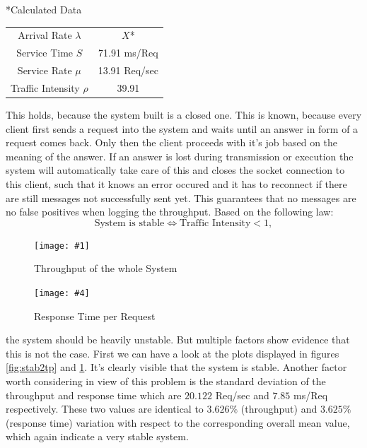 \documentclass[11pt]{article}
\newcommand\TwoFig[6]{%
	\sbox\IBoxA{\texttt{[image: \#1]}}
	\sbox\IBoxB{\texttt{[image: \#4]}}%
	\ifdim\ht\IBoxA>\ht\IBoxB
	\setlength\IHeight{\ht\IBoxB}\else\setlength\IHeight{\ht\IBoxA}\fi%
	\begin{figure}[!htb]
		\minipage[t]{0.5\textwidth}\centering
		\texttt{[image: \#1]}
		\caption{#2}\label{#3}
		\endminipage \hfill
		\minipage[t]{0.5\textwidth}\centering
		\texttt{[image: \#4]}
		\caption{#5}\label{#6}
		\endminipage
	\end{figure}%
}
\begin{document}
\begin{center}
	*{Calculated Data}
	\begin{tabular}{c|c}
		\hline
		Arrival Rate $\lambda$ & $X$* \\
		Service Time $S$ & 71.91 ms/Req \\
		Service Rate $\mu$ & 13.91 Req/sec \\
		Traffic Intensity $\rho$ & 39.91 \\
		\hline		
	\end{tabular}
\end{center}
\footnotesize*This holds, because the system built is a closed one. This is known, because every client first sends a request into the system and waits until an answer in form of a request comes back. Only then the client proceeds with it's job based on the meaning of the answer. If an answer is lost during transmission or execution the system will automatically take care of this and closes the socket connection to this client, such that it knows an error occured and it has to reconnect if there are still messages not successfully sent yet. This guarantees that no messages are no false positives when logging the throughput.
\normalsize
\newline\newline
Based on the following law:
\begin{equation}
	\text{System is stable}\Leftrightarrow \text{Traffic Intensity} < 1,
\end{equation}
\TwoFig {figures/stability_2/tp.eps} {Throughput of the whole System} {fig:stab2tp}
		{figures/stability_2/rt.eps} {Response Time per Request} {fig:stab2rt}
the system should be heavily unstable. But multiple factors show evidence that this is not the case. First we can have a look at the plots displayed in figures \ref{fig:stab2tp} and \ref{fig:stab2rt}. It's clearly visible that the system is stable. Another factor worth considering in view of this problem is the standard deviation of the throughput and response time which are $20.122$ Req/sec and $7.85$ ms/Req respectively. These two values are identical to $3.626\%$ (throughput) and $3.625\%$ (response time) variation with respect to the corresponding overall mean value, which again indicate a very stable system.
\end{document}
